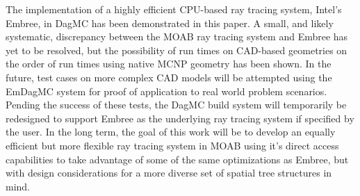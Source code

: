 \documentclass{anstrans}
\begin{document}
The implementation of a highly efficient CPU-based ray tracing system, Intel's Embree, in DagMC has been demonstrated in this paper. A small, and likely systematic, discrepancy between the MOAB ray tracing system and Embree has yet to be resolved, but the possibility of run times on CAD-based geometries on the order of run times using native MCNP geometry has been shown.
In the future, test cases on more complex CAD models will be attempted using the EmDagMC system for proof of application to real world problem scenarios. Pending the success of these tests, the DagMC build system will temporarily be redesigned to support Embree as the underlying ray tracing system if specified by the user. In the long term, the goal of this work will be to develop an equally efficient but more flexible ray tracing system in MOAB using it's direct access capabilities \cite{moab} to take advantage of some of the same optimizations as Embree, but with design considerations for a more diverse set of spatial tree structures in mind. 

\vspace{-0.2cm}


\end{document}

